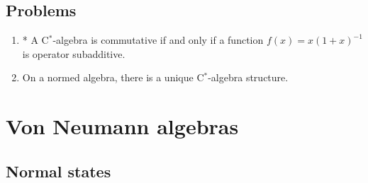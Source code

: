 \documentclass{../../large}
\begin{document}
\section*{Problems}
\begin{enumerate}
\item* A C$^*$-algebra is commutative if and only if a function $f(x)=x(1+x)^{-1}$ is operator subadditive.
\item On a normed algebra, there is a unique C$^*$-algebra structure.
\end{enumerate}






\chapter{Von Neumann algebras}

\section{Normal states}
\end{document}
